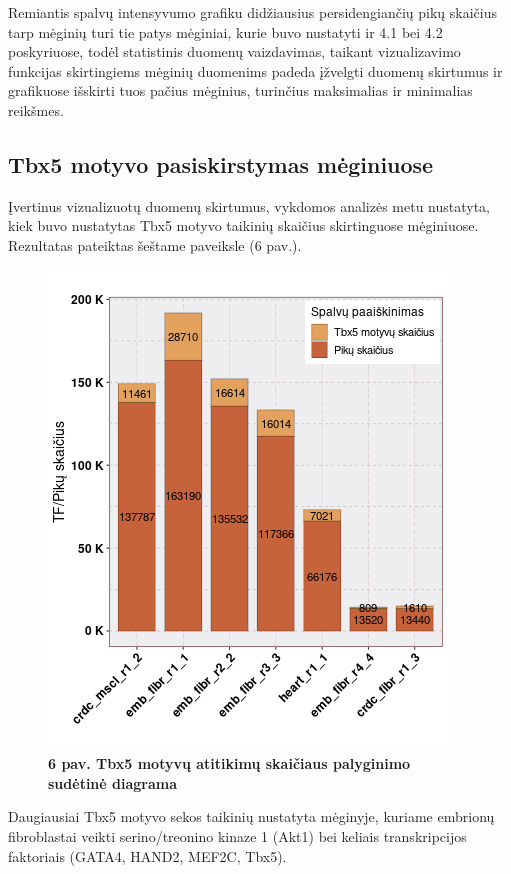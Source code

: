 \documentclass[12pt]{article}
\begin{document}
\newpage

Remiantis spalvų intensyvumo grafiku didžiausius persidengiančių pikų skaičius
tarp mėginių turi tie patys mėginiai, kurie buvo nustatyti ir 4.1 bei 4.2
poskyriuose, todėl statistinis duomenų vaizdavimas, taikant vizualizavimo
funkcijas skirtingiems mėginių duomenims padeda įžvelgti duomenų skirtumus
ir grafikuose išskirti tuos pačius mėginius, turinčius maksimalias ir
minimalias reikšmes.


\subsection{Tbx5 motyvo pasiskirstymas mėginiuose}
Įvertinus vizualizuotų duomenų skirtumus, vykdomos analizės metu nustatyta,
kiek buvo nustatytas Tbx5 motyvo taikinių skaičius skirtinguose mėginiuose.
Rezultatas pateiktas šeštame paveiksle (6 pav.).

\begin{figure}[htb]
    \begin{center}
        \includegraphics[width=0.5\linewidth]{../Figures/tf_hit_percentage.png}
        \vspace{-2\baselineskip}
        \caption*{\small\textbf{6 pav. Tbx5 motyvų atitikimų skaičiaus palyginimo
                                sudėtinė diagrama}}
    \end{center}
\end{figure}

Daugiausiai Tbx5 motyvo sekos taikinių nustatyta mėginyje,
kuriame embrionų fibroblastai veikti serino/treonino kinaze 1 (Akt1) bei
keliais transkripcijos faktoriais (GATA4, HAND2, MEF2C, Tbx5).
\end{document}
